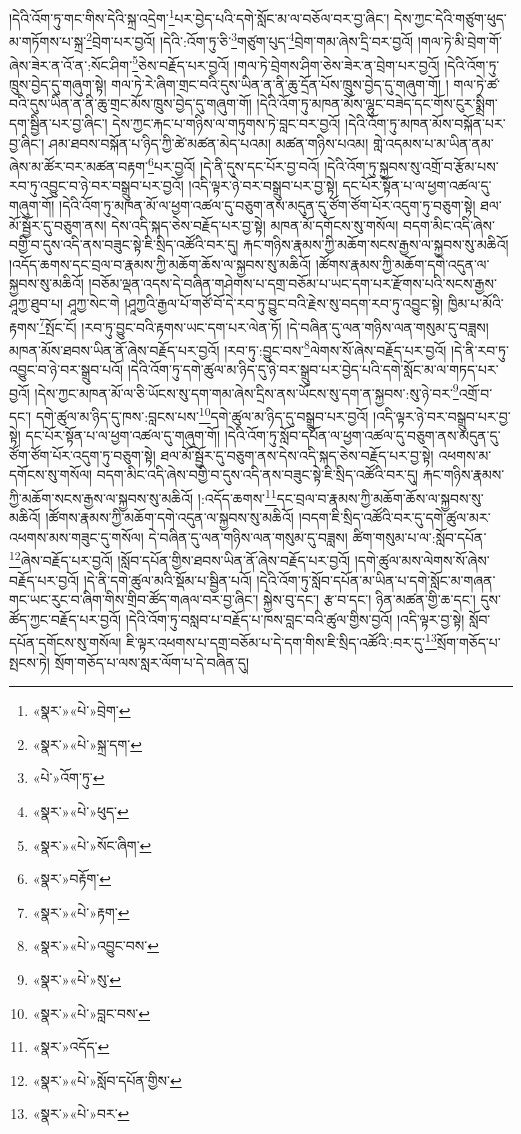 །དེའི་འོག་ཏུ་གང་གིས་དེའི་སྐྲ་འདྲེག་\footnote{«སྣར་»«པེ་»བྲེག་}པར་བྱེད་པའི་དགེ་སློང་མ་ལ་བཅོལ་བར་བྱ་ཞིང་། དེས་ཀྱང་དེའི་གཙུག་ཕུད་མ་གཏོགས་པ་སྐྲ་\footnote{«སྣར་»«པེ་»སྐྲ་དག་}བྲེག་པར་བྱའོ། །དེའི་:འོག་ཏུ་ཅི་\footnote{«པེ་»འོག་ཏུ་}གཙུག་པུད་\footnote{«སྣར་»«པེ་»ཕུད་}བྲེག་གམ་ཞེས་དྲི་བར་བྱའོ། །གལ་ཏེ་མི་བྲེག་གོ་ཞེས་ཟེར་ན་འོ་ན་:སོང་ཤིག་\footnote{«སྣར་»«པེ་»སོང་ཞིག་}ཅེས་བརྗོད་པར་བྱའོ། །གལ་ཏེ་བྲེགས་ཤིག་ཅེས་ཟེར་ན་བྲེག་པར་བྱའོ། །དེའི་འོག་ཏུ་ཁྲུས་བྱེད་དུ་གཞུག་སྟེ། གལ་ཏེ་རེ་ཞིག་གྲང་བའི་དུས་ཡིན་ན་ནི་ཆུ་དྲོན་པོས་ཁྲུས་བྱེད་དུ་གཞུག་གོ། །
གལ་ཏེ་ཚ་བའི་དུས་ཡིན་ན་ནི་ཆུ་གྲང་མོས་ཁྲུས་བྱེད་དུ་གཞུག་གོ། །དེའི་འོག་ཏུ་མཁན་མོས་ལྷུང་བཟེད་དང་གོས་ངུར་སྨྲིག་དག་སྦྱིན་པར་བྱ་ཞིང་། དེས་ཀྱང་རྐང་པ་གཉིས་ལ་གཏུགས་ཏེ་བླང་བར་བྱའོ། །དེའི་འོག་ཏུ་མཁན་མོས་བསྐོན་པར་བྱ་ཞིང་། ཤམ་ཐབས་བསྐོན་པ་ཉིད་ཀྱི་ཚེ་མཚན་མེད་པའམ། མཚན་གཉིས་པའམ། གླེ་འདམས་པ་མ་ཡིན་ནམ་ཞེས་མ་ཚོར་བར་མཚན་བརྟག་\footnote{«སྣར་»བརྟོག་}པར་བྱའོ། །དེ་ནི་དུས་དང་པོར་བྱ་བའོ། །དེའི་འོག་ཏུ་སྐྱབས་སུ་འགྲོ་བ་རྩོམ་པས་རབ་ཏུ་འབྱུང་བ་ཉེ་བར་བསྒྲུབ་པར་བྱའོ། །འདི་ལྟར་ཉེ་བར་བསྒྲུབ་པར་བྱ་སྟེ། དང་པོར་སྟོན་པ་ལ་ཕྱག་འཚལ་དུ་གཞུག་གོ། །དེའི་འོག་ཏུ་མཁན་མོ་ལ་ཕྱག་འཚལ་དུ་བཅུག་ནས་མདུན་དུ་ཙོག་ཙོག་པོར་འདུག་ཏུ་བཅུག་སྟེ། ཐལ་མོ་སྦྱོར་དུ་བཅུག་ནས། དེས་འདི་སྐད་ཅེས་བརྗོད་པར་བྱ་སྟེ། མཁན་མོ་དགོངས་སུ་གསོལ། བདག་མིང་འདི་ཞེས་བགྱི་བ་དུས་འདི་ནས་བཟུང་སྟེ་ཇི་སྲིད་འཚོའི་བར་དུ། རྐང་གཉིས་རྣམས་ཀྱི་མཆོག་སངས་རྒྱས་ལ་སྐྱབས་སུ་མཆིའོ། །འདོད་ཆགས་དང་བྲལ་བ་རྣམས་ཀྱི་མཆོག་ཆོས་ལ་སྐྱབས་སུ་མཆིའོ། །ཚོགས་རྣམས་ཀྱི་མཆོག་དགེ་འདུན་ལ་སྐྱབས་སུ་མཆིའོ། །བཅོམ་ལྡན་འདས་དེ་བཞིན་གཤེགས་པ་དགྲ་བཅོམ་པ་ཡང་དག་པར་རྫོགས་པའི་སངས་རྒྱས་ཤཱཀྱ་ཐུབ་པ། ཤཱཀྱ་སེང་གེ །ཤཱཀྱའི་རྒྱལ་པོ་གཙོ་བོ་དེ་རབ་ཏུ་བྱུང་བའི་རྗེས་སུ་བདག་རབ་ཏུ་འབྱུང་སྟེ། ཁྱིམ་པ་མོའི་རྟགས་\footnote{«སྣར་»«པེ་»རྟག་}སྤོང་ངོ། །རབ་ཏུ་བྱུང་བའི་རྟགས་ཡང་དག་པར་ལེན་ཏོ། །དེ་བཞིན་དུ་ལན་གཉིས་ལན་གསུམ་དུ་བཟླས། མཁན་མོས་ཐབས་ཡིན་ནོ་ཞེས་བརྗོད་པར་བྱའོ། །རབ་ཏུ་:བྱུང་བས་\footnote{«སྣར་»«པེ་»འབྱུང་བས་}ལེགས་སོ་ཞེས་བརྗོད་པར་བྱའོ། །དེ་ནི་རབ་ཏུ་འབྱུང་བ་ཉེ་བར་སྒྲུབ་པའོ། །དེའི་འོག་ཏུ་དགེ་ཚུལ་མ་ཉིད་དུ་ཉེ་བར་སྒྲུབ་པར་བྱེད་པའི་དགེ་སློང་མ་ལ་གཏད་པར་བྱའོ། །དེས་ཀྱང་མཁན་མོ་ལ་ཅི་ཡོངས་སུ་དག་གམ་ཞེས་དྲིས་ནས་ཡོངས་སུ་དག་ན་སྐྱབས་:སུ་ཉེ་བར་\footnote{«སྣར་»«པེ་»སུ་}འགྲོ་བ་དང་། དགེ་ཚུལ་མ་ཉིད་དུ་ཁས་:བླངས་པས་\footnote{«སྣར་»«པེ་»བླང་བས་}དགེ་ཚུལ་མ་ཉིད་དུ་བསྒྲུབ་པར་བྱའོ། །འདི་ལྟར་ཉེ་བར་བསྒྲུབ་པར་བྱ་སྟེ། དང་པོར་སྟོན་པ་ལ་ཕྱག་འཚལ་དུ་གཞུག་གོ། །དེའི་འོག་ཏུ་སློབ་དཔོན་ལ་ཕྱག་འཚལ་དུ་བཅུག་ནས་མདུན་དུ་ཙོག་ཙོག་པོར་འདུག་ཏུ་བཅུག་སྟེ། ཐལ་མོ་སྦྱོར་དུ་བཅུག་ནས་དེས་འདི་སྐད་ཅེས་བརྗོད་པར་བྱ་སྟེ། འཕགས་མ་དགོངས་སུ་གསོལ། བདག་མིང་འདི་ཞེས་བགྱི་བ་དུས་འདི་ནས་བཟུང་སྟེ་ཇི་སྲིད་འཚོའི་བར་དུ། རྐང་གཉིས་རྣམས་ཀྱི་མཆོག་སངས་རྒྱས་ལ་སྐྱབས་སུ་མཆིའོ། །:འདོད་ཆགས་\footnote{«སྣར་»འདོད་}དང་བྲལ་བ་རྣམས་ཀྱི་མཆོག་ཆོས་ལ་སྐྱབས་སུ་མཆིའོ། །ཚོགས་རྣམས་ཀྱི་མཆོག་དགེ་འདུན་ལ་སྐྱབས་སུ་མཆིའོ། །བདག་ཇི་སྲིད་འཚོའི་བར་དུ་དགེ་ཚུལ་མར་འཕགས་མས་གཟུང་དུ་གསོལ། དེ་བཞིན་དུ་ལན་གཉིས་ལན་གསུམ་དུ་བཟླས། ཚིག་གསུམ་པ་ལ་:སློབ་དཔོན་\footnote{«སྣར་»«པེ་»སློབ་དཔོན་གྱིས་}ཞེས་བརྗོད་པར་བྱའོ། །སློབ་དཔོན་གྱིས་ཐབས་ཡིན་ནོ་ཞེས་བརྗོད་པར་བྱའོ། །དགེ་ཚུལ་མས་ལེགས་སོ་ཞེས་བརྗོད་པར་བྱའོ། །དེ་ནི་དགེ་ཚུལ་མའི་སྡོམ་པ་སྦྱིན་པའོ། །དེའི་འོག་ཏུ་སློབ་དཔོན་མ་ཡིན་པ་དགེ་སློང་མ་གཞན་གང་ཡང་རུང་བ་ཞིག་གིས་གྲིབ་ཚོད་གཞལ་བར་བྱ་ཞིང་། སྐྱེས་བུ་དང་། རྩ་བ་དང་། ཉིན་མཚན་གྱི་ཆ་དང་། དུས་ཚོད་ཀྱང་བརྗོད་པར་བྱའོ། །དེའི་འོག་ཏུ་བསླབ་པ་བརྗོད་པ་ཁས་བླང་བའི་ཚུལ་གྱིས་བྱའོ། །འདི་ལྟར་བྱ་སྟེ། སློབ་དཔོན་དགོངས་སུ་གསོལ། ཇི་ལྟར་འཕགས་པ་དགྲ་བཅོམ་པ་དེ་དག་གིས་ཇི་སྲིད་འཚོའི་:བར་དུ་\footnote{«སྣར་»«པེ་»བར་}སྲོག་གཅོད་པ་སྤངས་ཏེ། སྲོག་གཅོད་པ་ལས་སླར་ལོག་པ་དེ་བཞིན་དུ། 